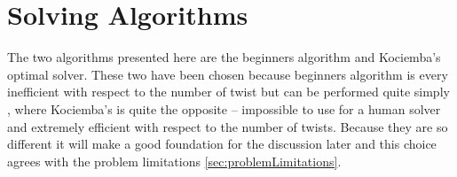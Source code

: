 \chapter{Solving Algorithms}
\label{cha:solvingAlgorithms}
The two algorithms presented here are the beginners algorithm and Kociemba's optimal solver.
These two have been chosen because beginners algorithm is every inefficient with respect to the number of twist but can be performed quite simply \cite{beginner}, where Kociemba's is quite the opposite -- impossible to use for a human solver and extremely efficient with respect to the number of twists.
Because they are so different it will make a good foundation for the discussion later and this choice agrees with the problem limitations \ref{sec:problemLimitations}.

	
	

